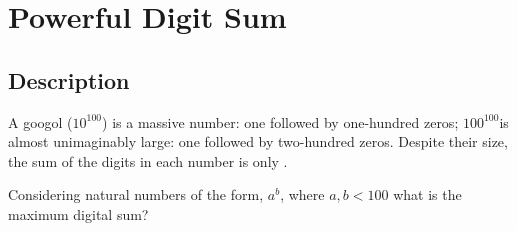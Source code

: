 \chapter{Powerful Digit Sum}
\section{Description}
A googol ($10^{100}$) is a massive number: one followed by one-hundred zeros;
$100^{100}$is almost unimaginably large: one followed by two-hundred zeros. Despite their size, the sum of the digits in
each number is only .

Considering natural numbers of the form, $a^b$, where $a, b < 100$ what is the maximum digital sum?
